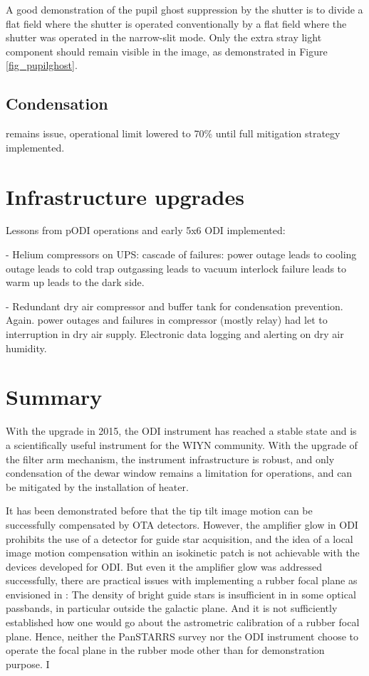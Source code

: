 \documentclass[draft]{spieman}
\begin{document}
A good demonstration of the pupil ghost suppression by the shutter is to divide
a flat field where the shutter is operated conventionally by a flat field where
the shutter was operated in the narrow-slit mode. Only the extra stray light
component should remain visible in the image, as demonstrated in Figure
\ref{fig_pupilghost}.


\subsection{Condensation}

remains issue, operational limit lowered to 70\% until full mitigation
strategy implemented.



\section{Infrastructure upgrades}

Lessons from pODI operations and early 5x6 ODI implemented:

- Helium compressors on UPS: cascade of failures: power outage leads to cooling outage leads to 
cold trap outgassing leads to vacuum interlock failure leads to warm up leads to the dark side. 

- Redundant dry air compressor and buffer tank for condensation prevention. Again. power outages 
and failures in compressor (mostly relay) had let to interruption in dry air supply.  Electronic 
data logging and alerting on dry air humidity.




\section{Summary}

With the upgrade in 2015, the ODI instrument has reached a stable state and is a scientifically useful 
instrument for the WIYN community. With the upgrade of the filter arm mechanism, the instrument 
infrastructure is robust, and only condensation of the dewar window remains a limitation for 
operations, and can be mitigated by the installation of  heater.  

It has been demonstrated before that the tip tilt image motion can be successfully compensated by 
OTA detectors.  However, the amplifier glow in ODI prohibits the use of a detector for guide star 
acquisition, and the idea of a local image motion compensation within an isokinetic patch is not 
achievable with the devices developed for ODI. But even it the amplifier glow was addressed 
successfully, 
there are practical issues with implementing a rubber focal plane as envisioned in \cite{tonry2002}: The 
density of  bright guide stars is insufficient in in some  optical passbands, in particular outside the 
galactic plane. And it is not sufficiently established how one would go about the astrometric calibration 
of a rubber focal plane.  Hence, neither the PanSTARRS survey nor the ODI instrument choose to 
operate the focal plane in the rubber mode other than for demonstration purpose.  I
\end{document}
